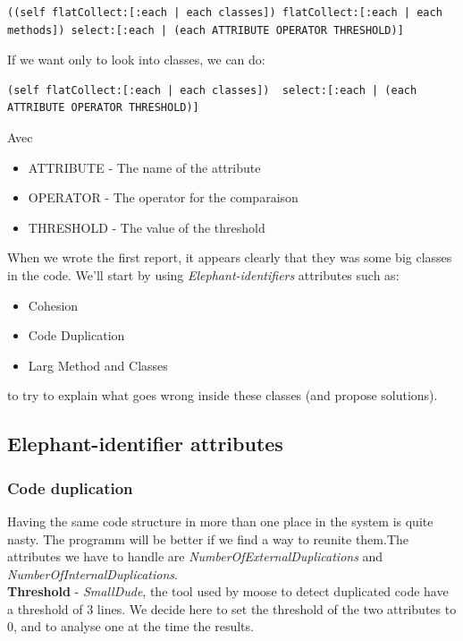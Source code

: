 \documentclass[11pt,a4paper]{article}
\begin{document}
\begin{lstlisting}
((self flatCollect:[:each | each classes]) flatCollect:[:each | each methods]) select:[:each | (each ATTRIBUTE OPERATOR THRESHOLD)] 
\end{lstlisting}

If we want only to look into classes, we can do:\\
\begin{lstlisting}
(self flatCollect:[:each | each classes])  select:[:each | (each ATTRIBUTE OPERATOR THRESHOLD)]
\end{lstlisting}
Avec
\begin{itemize}
\item ATTRIBUTE - The name of the attribute
\item OPERATOR - The operator for the comparaison
\item THRESHOLD - The value of the threshold
 \end{itemize}

When we wrote the first report, it appears clearly that they was some big classes in the code. We'll start by using \textit{Elephant-identifiers} attributes such as:
\begin{itemize}
\item Cohesion
\item Code Duplication
\item Larg Method and Classes
\end{itemize}

to try to explain what goes wrong inside these classes (and propose solutions).  
\subsection{Elephant-identifier attributes}
\subsubsection{Code duplication}
Having the same code structure in more than one place in the system is quite nasty. The programm will be better if we find a way to reunite them.The attributes we have to handle are \textit{NumberOfExternalDuplications} and \textit{NumberOfInternalDuplications}.\\

\textbf{Threshold} - \textit{SmallDude}, the tool used by moose to detect duplicated code have a threshold of 3 lines. We decide here to set the threshold of the two attributes to 0, and to analyse one at the time the results.\\
\end{document}
